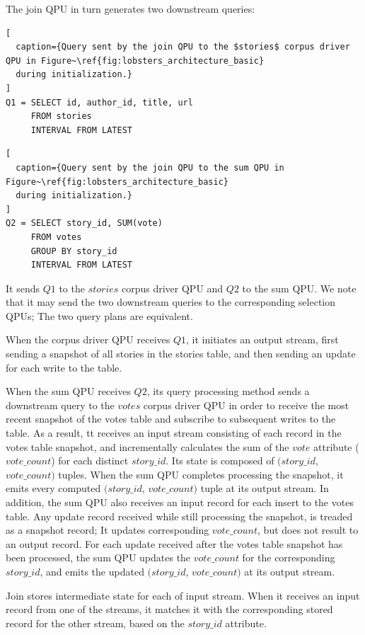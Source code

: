 \noindent
The join QPU in turn generates two downstream queries:

\begin{lstlisting}[
  caption={Query sent by the join QPU to the $stories$ corpus driver QPU in Figure~\ref{fig:lobsters_architecture_basic}
  during initialization.}
]
Q1 = SELECT id, author_id, title, url
     FROM stories
     INTERVAL FROM LATEST
\end{lstlisting}

\begin{lstlisting}[
  caption={Query sent by the join QPU to the sum QPU in Figure~\ref{fig:lobsters_architecture_basic}
  during initialization.}
]
Q2 = SELECT story_id, SUM(vote)
     FROM votes
     GROUP BY story_id
     INTERVAL FROM LATEST
\end{lstlisting}

\noindent
It sends $Q1$ to the $stories$ corpus driver QPU and $Q2$ to the sum QPU.
We note that it may send the two downstream queries to the corresponding selection QPUs;
The two query plans are equivalent.

When the corpus driver QPU receives $Q1$, it initiates an output stream,
first sending a snapshot of all stories in the stories table,
and then sending an update for each write to the table.

When the sum QPU receives $Q2$, its query processing method sends a downstream query to the $votes$ corpus driver QPU
in order to receive the most recent snapshot of the votes table and subscribe to subsequent writes to the table.
As a result, tt receives an input stream consisting of each record in the votes table snapshot,
and incrementally calculates the sum of the $vote$ attribute ($vote\_count$) for each distinct $story\_id$.
Its state is composed of $(story\_id$, $vote\_count)$ tuples.
When the sum QPU completes processing the snapshot, it emits every computed $(story\_id$, $vote\_count)$ tuple
at its output stream.
In addition, the sum QPU also receives an input record for each insert to the votes table.
Any update record received while still processing the snapshot, is treaded as a snapshot record;
It updates corresponding $vote\_count$, but does not result to an output record.
For each update received after the votes table snapshot has been processed,
the sum QPU updates the $vote\_count$ for the corresponding $story\_id$,
and emits the updated $(story\_id$, $vote\_count)$ at its output stream.

Join stores intermediate state for each of input stream.
When it receives an input record from one of the streams,
it matches it with the corresponding stored record for the other stream,
based on the $story\_id$ attribute.

